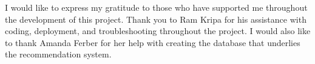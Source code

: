 

I would like to express my gratitude to those who have supported me throughout the development of this project. Thank you to Ram Kripa for his assistance with coding, deployment, and troubleshooting throughout the project. I would also like to thank Amanda Ferber for her help with creating the database that underlies the recommendation system. 